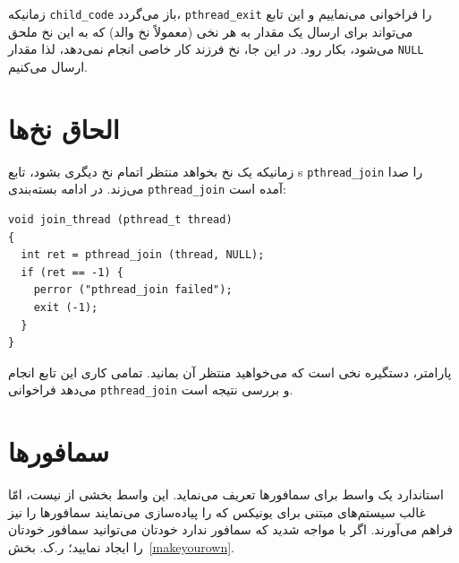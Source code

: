 \documentclass{book}
\begin{document}
    زمانیکه {\tt child\_code} باز می‌گردد، {\tt pthread\_exit} را فراخوانی می‌نماییم 
    و این تابع می‌تواند برای ارسال یک مقدار به هر نخی (معمولاً نخ والد) که به این نخ ملحق می‌شود، بکار رود. 
    در این جا، نخ فرزند کار خاصی انجام نمی‌دهد، لذا مقدار  {\tt NULL} ارسال می‌کنیم. 


\section{الحاق نخ‌ها }


    زمانیکه یک نخ بخواهد منتظر اتمام نخ دیگری بشود، تابع s {\tt pthread\_join} را صدا می‌زند. 
    در ادامه بسته‌بندی  {\tt pthread\_join} آمده است:‌
    

\begin{latin}
\begin{lstlisting}
void join_thread (pthread_t thread)
{
  int ret = pthread_join (thread, NULL);
  if (ret == -1) {
    perror ("pthread_join failed");
    exit (-1);
  }
}
\end{lstlisting}
\end{latin}

    پارامتر، دستگیره نخی است که می‌خواهید منتظر آن بمانید. تمامی کاری این تابع انجام می‌دهد فراخوانی  {\tt pthread\_join} و بررسی نتیجه است. 


\section{سمافورها}

    استاندارد   یک واسط برای سمافورها تعریف می‌نماید. 
    این واسط بخشی از  نیست، امّا غالب سیستم‌های مبتنی برای یونیکس که  را پیاده‌سازی می‌نمایند سمافورها را نیز فراهم می‌آورند. 
    اگر با  مواجه شدید که سمافور ندارد خودتان می‌توانید سمافور خودتان را ایجاد نمایید؛ ر.ک. بخش~\ref{makeyourown}.
    
\end{document}
